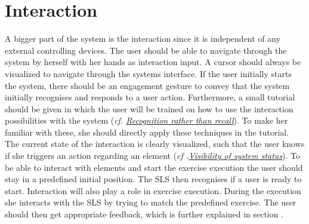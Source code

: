 \section{Interaction}\label{4_2_interaction}
A bigger part of the system is the interaction since it is independent of any external controlling devices.
The user should be able to navigate through the system by herself with her hands as interaction input.
A cursor should always be visualized to navigate through the systems interface.
If the user initially starts the system, there should be an engagement gesture to convey that the system initially recognises and responds to a user action.
Furthermore, a small tutorial should be given in which the user will be trained on how to use the interaction possibilities with the system (\textit{cf. \hyperref[nielsenDesignPrinciples]{Recognition rather than recall}}).
To make her familiar with these, she should directly apply these techniques in the tutorial.
The current state of the interaction is clearly visualized, such that the user knows if she triggers an action regarding an element (\textit{cf .\hyperref[nielsenDesignPrinciples]{Visibility of system status}}).
To be able to interact with elements and start the exercise execution the user should stay in a predefined initial position.
The SLS then recognises if a user is ready to start. Interaction will also play a role in exercise execution.
During the execution she interacts with the SLS by trying to match the predefined exercise.
The user should then get appropriate feedback, which is further explained in section \textit{}.

\begin{comment}
- user can and should interact with the system
\\- Cursor visualization as hand image
\\- Engagement gesture for first interaction with Kinect (One hand over shoulder)
\\- She should be instructed how to interact 
\\- Different interaction methods should be provided to prevent failing on one (tutorial --> clicking (variations) + scrolling)
\end{comment}